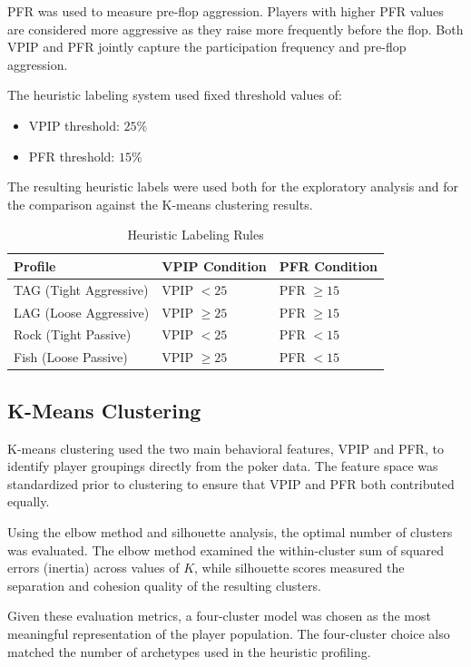\documentclass[sigconf]{acmart}
\begin{document}
PFR was used to measure pre-flop aggression. Players with higher PFR values are considered more aggressive as they raise more frequently before the flop. Both VPIP and PFR jointly capture the participation frequency and pre-flop aggression. 

The heuristic labeling system used fixed threshold values of:
\begin{itemize}
    \item VPIP threshold: $25\%$
    \item PFR threshold: $15\%$
\end{itemize}

The resulting heuristic labels were used both for the exploratory analysis and for the comparison against the K-means clustering results.

\begin{table}[t]
  \caption{Heuristic Labeling Rules}
  \label{tab:heuristic-rules}
  \centering
  \begin{tabular}{lll}
    \toprule
    Profile & VPIP Condition & PFR Condition \\
    \midrule
    TAG (Tight Aggressive) & VPIP $< 25$ & PFR $\geq 15$ \\
    LAG (Loose Aggressive) & VPIP $\geq 25$ & PFR $\geq 15$ \\
    Rock (Tight Passive) & VPIP $< 25$ & PFR $< 15$ \\
    Fish (Loose Passive) & VPIP $\geq 25$ & PFR $< 15$ \\
    \bottomrule
  \end{tabular}
\end{table}

\subsection{K-Means Clustering}
K-means clustering used the two main behavioral features, VPIP and PFR, to identify player groupings directly from the poker data. The feature space was standardized prior to clustering to ensure that VPIP and PFR both contributed equally. 

Using the elbow method and silhouette analysis, the optimal number of clusters was evaluated. The elbow method examined the within-cluster sum of squared errors (inertia) across values of $K$, while silhouette scores measured the separation and cohesion quality of the resulting clusters.

Given these evaluation metrics, a four-cluster model was chosen as the most meaningful representation of the player population. The four-cluster choice also matched the number of archetypes used in the heuristic profiling.
\end{document}
